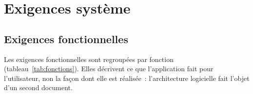 \section{Exigences système}

\subsection{Exigences fonctionnelles}
\label{sec:fonctionnelles}

Les exigences fonctionnelles sont regroupées par fonction (tableau~\ref{tab:fonctions}).
Elles décrivent ce que l'application fait pour l'utilisateur, non la façon dont elle est
réalisée~: l'architecture logicielle fait l'objet d'un second document.









